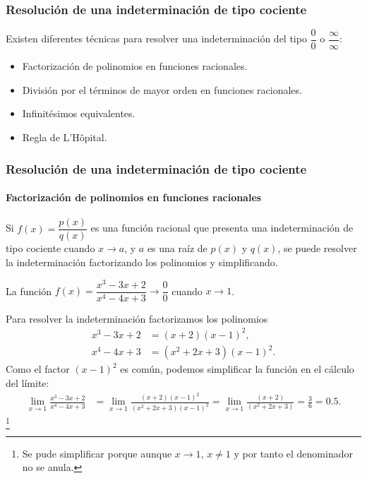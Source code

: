 	
	\begin{frame}
		\frametitle{Resolución de una indeterminación de tipo cociente}
		Existen diferentes técnicas para resolver una indeterminación del tipo $\dfrac{0}{0}$ o $\dfrac{\infty}{\infty}$:
		\begin{itemize}
			\item Factorización de polinomios en funciones racionales.
			\item División por el términos de mayor orden en funciones racionales.
			\item Infinitésimos equivalentes.
			\item Regla de L'Hôpital.
		\end{itemize}
	\end{frame}
	
	
	\begin{frame}
		\frametitle{Resolución de una indeterminación de tipo cociente}
		\framesubtitle{Factorización de polinomios en funciones racionales}
		Si $f(x)=\dfrac{p(x)}{q(x)}$ es una función racional que presenta una indeterminación de tipo cociente cuando $x\rightarrow a$, y $a$ es una raíz de $p(x)$ y $q(x)$, se puede resolver la indeterminación factorizando los polinomios y simplificando.
		
		 La función $f(x)=\dfrac{x^3-3x+2}{x^4-4x+3}\rightarrow \dfrac{0}{0}$ cuando $x\rightarrow 1$.
		
		Para resolver la indeterminación factorizamos los polinomios
		\begin{align*}
			x^3-3x+2 & = (x+2)(x-1)^2,      \\
			x^4-4x+3 & = (x^2+2x+3)(x-1)^2. 
		\end{align*}
		Como el factor $(x-1)^2$ es común, podemos simplificar la función en el cálculo del límite:
		\begin{align*}
			\lim_{x\rightarrow 1}\frac{x^3-3x+2}{x^4-4x+3} & = 
			\lim_{x\rightarrow 1}\frac{(x+2)(x-1)^2}{(x^2+2x+3)(x-1)^2} =
			\lim_{x\rightarrow 1}\frac{(x+2)}{(x^2+2x+3)} =\frac{3}{6}=0.5.
		\end{align*}\footnote{Se pude simplificar porque aunque $x\rightarrow 1$, $x\neq 1$ y por tanto el denominador no se anula.}
	\end{frame}
	
